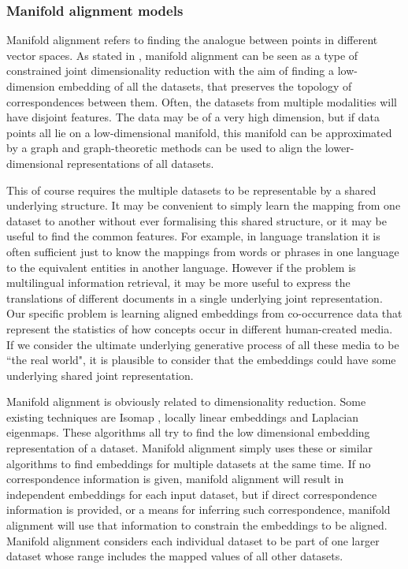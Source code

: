 \subsubsection{Manifold alignment models}
Manifold alignment refers to finding the analogue between points in different vector spaces. As stated in \cite{ManifoldLearningTheoryAndApplications}, manifold alignment can be seen as a type of constrained joint dimensionality reduction with the aim of finding a low-dimension embedding of all the datasets, that preserves the topology of correspondences between them. Often, the datasets from multiple modalities will have disjoint features. The data may be of a very high dimension, but if data points all lie on a low-dimensional manifold, this manifold can be approximated by a graph and graph-theoretic methods can be used to align the lower-dimensional representations of all datasets. 

This of course requires the multiple datasets to be representable by a shared underlying structure. It may be convenient to simply learn the mapping from one dataset to another without ever formalising this shared structure, or it may be useful to find the common features. For example, in language translation it is often sufficient just to know the mappings from words or phrases in one language to the equivalent entities in another language. However if the problem is multilingual information retrieval, it may be more useful to express the translations of different documents in a single underlying joint representation. Our specific problem is learning aligned embeddings from co-occurrence data that represent the statistics of how concepts occur in different human-created media. If we consider the ultimate underlying generative process of all these media to be ``the real world", it is plausible to consider that the embeddings could have some underlying shared joint representation. 

Manifold alignment is obviously related to dimensionality reduction. Some existing techniques are Isomap , locally linear embeddings and Laplacian eigenmaps. These algorithms all try to find the low dimensional embedding representation of a dataset. Manifold alignment simply uses these or similar algorithms to find embeddings for multiple datasets at the same time. If no correspondence information is given, manifold alignment will result in independent embeddings for each input dataset, but if direct correspondence information is provided, or a means for inferring such correspondence, manifold alignment will use that information to constrain the embeddings to be aligned. Manifold alignment considers each individual dataset to be part of one larger dataset whose range includes the mapped values of all other datasets. 

